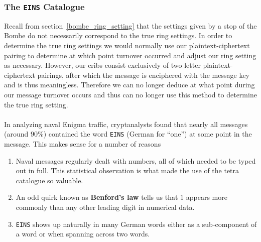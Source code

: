   \subsubsection{The \texttt{EINS} Catalogue}
  Recall from section~\ref{bombe_ring_setting} that the settings
  given by a stop of the Bombe do not necessarily correspond to the
  true ring settings. In order to determine the true ring settings we
  would normally use our plaintext-ciphertext pairing to determine at
  which point turnover occurred and adjust our ring setting as
  necessary. However, our cribs consist exclusively of two letter
  plaintext-ciphertext pairings, after which the message is
  enciphered with the message key and is thus meaningless. Therefore
  we can no longer deduce at what point during our message turnover
  occurs and thus can no longer use this method to determine the true
  ring setting.
  \\\\In analyzing naval Enigma traffic, cryptanalysts found that
  nearly all messages (around $90\%$) contained the word
  \texttt{EINS} (German for ``one'') at some point in the message.
  This makes sense for a number of reasons
  \begin{enumerate}
    \item Naval messages regularly dealt with numbers, all of which
      needed to be typed out in full. This statistical observation is
      what made the use of the tetra catalogue so valuable.
    \item An odd quirk known as {\bf{Benford's law}} tells us that
      $1$ appears more commonly than any other leading digit in numerical data.
    \item \texttt{EINS} shows up naturally in many German words
      either as a sub-component of a word or when spanning across two words.
  \end{enumerate}

